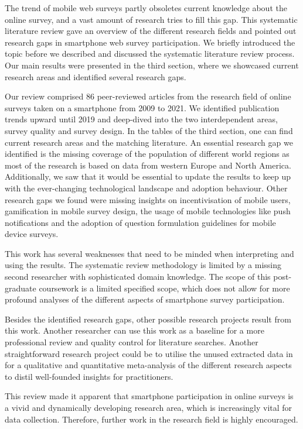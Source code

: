 The trend of mobile web surveys partly obsoletes current knowledge about the online survey, and a vast amount of research tries to fill this gap. This systematic literature review gave an overview of the different research fields and pointed out research gaps in smartphone web survey participation. We briefly introduced the topic before we described and discussed the systematic literature review process. Our main results were presented in the third section, where we showcased current research areas and identified several research gaps.  

Our review comprised 86 peer-reviewed articles from the research field of online surveys taken on a smartphone from 2009 to 2021. We identified publication trends upward until 2019 and deep-dived into the two interdependent areas, survey quality and survey design. In the tables of the third section, one can find current research areas and the matching literature. An essential research gap we identified is the missing coverage of the population of different world regions as most of the research is based on data from western Europe and North America. Additionally, we saw that it would be essential to update the results to keep up with the ever-changing technological landscape and adoption behaviour. Other research gaps we found were missing insights on incentivisation of mobile users, gamification in mobile survey design, the usage of mobile technologies like push notifications and the adoption of question formulation guidelines for mobile device surveys. 

This work has several weaknesses that need to be minded when interpreting and using the results. The systematic review methodology is limited by a missing second researcher with sophisticated domain knowledge. The scope of this post-graduate coursework is a limited specified scope, which does not allow for more profound analyses of the different aspects of smartphone survey participation. 

Besides the identified research gaps, other possible research projects result from this work. Another researcher can use this work as a baseline for a more professional review and quality control for literature searches. Another straightforward research project could be to utilise the unused extracted data in \cite{langenbahn_smartphone_2021} for a qualitative and quantitative meta-analysis of the different research aspects to distil well-founded insights for practitioners.

This review made it apparent that smartphone participation in online surveys is a vivid and dynamically developing research area, which is increasingly vital for data collection. Therefore, further work in the research field is highly encouraged.




